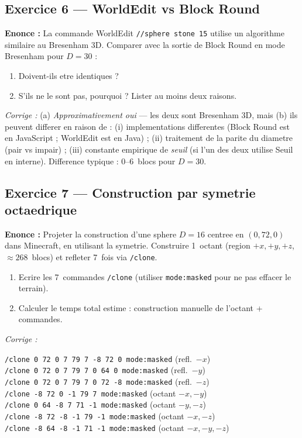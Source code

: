 \documentclass[12pt,a4paper]{scrartcl}
\newcommand{\cmd}[1]{\textcolor{earth}{\texttt{\small #1}}}
\begin{document}
\subsection*{Exercice 6 --- WorldEdit vs Block Round}
\textbf{Enonce :} La commande WorldEdit \cmd{//sphere stone 15} utilise un algorithme similaire au Bresenham 3D. Comparer avec la sortie de Block Round en mode Bresenham pour $D = 30$ :
\begin{enumerate}[label=\alph*),leftmargin=1.5em,itemsep=0.1em,topsep=0.2em,nosep]
  \item Doivent-ils etre identiques ?
  \item S'ils ne le sont pas, pourquoi ? Lister au moins deux raisons.
\end{enumerate}

\emph{Corrige :}
(a) \emph{Approximativement oui} --- les deux sont Bresenham 3D, mais (b) ils peuvent differer en raison de : (i) implementations differentes (Block Round est en JavaScript ; WorldEdit est en Java) ; (ii) traitement de la parite du diametre (pair vs impair) ; (iii) constante empirique de \emph{seuil} (si l'un des deux utilise Seuil en interne). Difference typique : 0--6~blocs pour $D = 30$.

\subsection*{Exercice 7 --- Construction par symetrie octaedrique}
\textbf{Enonce :} Projeter la construction d'une sphere $D = 16$ centree en $(0, 72, 0)$ dans Minecraft, en utilisant la symetrie. Construire 1~octant (region $+x, +y, +z$, $\approx 268$~blocs) et refleter 7~fois via \cmd{/clone}.
\begin{enumerate}[label=\alph*),leftmargin=1.5em,itemsep=0.1em,topsep=0.2em,nosep]
  \item Ecrire les 7~commandes \cmd{/clone} (utiliser \cmd{mode:masked} pour ne pas effacer le terrain).
  \item Calculer le temps total estime : construction manuelle de l'octant + commandes.
\end{enumerate}

\emph{Corrige :}

\begin{minecraft}
\cmd{/clone 0 72 0 7 79 7 -8 72 0 mode:masked} \quad (refl.\ $-x$)\\
\cmd{/clone 0 72 0 7 79 7 0 64 0 mode:masked} \quad\quad (refl.\ $-y$)\\
\cmd{/clone 0 72 0 7 79 7 0 72 -8 mode:masked} \quad (refl.\ $-z$)\\
\cmd{/clone -8 72 0 -1 79 7 mode:masked} \quad\quad\;\; (octant $-x,-y$)\\
\cmd{/clone 0 64 -8 7 71 -1 mode:masked} \quad\quad\;\; (octant $-y,-z$)\\
\cmd{/clone -8 72 -8 -1 79 -1 mode:masked} \quad\;\; (octant $-x,-z$)\\
\cmd{/clone -8 64 -8 -1 71 -1 mode:masked} \quad\;\; (octant $-x,-y,-z$)
\end{minecraft}
\end{document}
